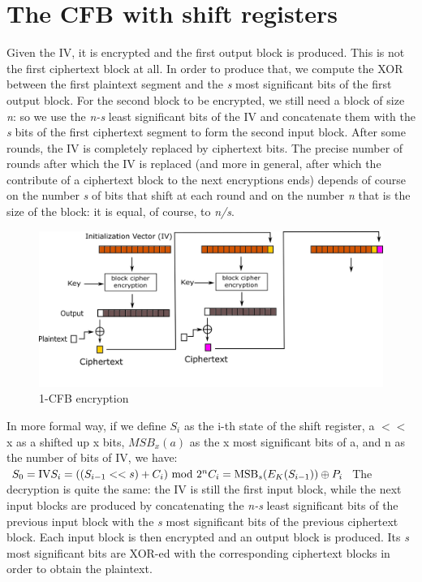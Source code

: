 \documentclass[11 pt]{article}
\begin{document}
\section{The CFB with shift registers}
Given the IV, it is encrypted and the first output block is produced. This is not the first ciphertext block at all. In order to produce that, we compute the XOR between the first plaintext segment and the \textit{s} most significant bits of the first output block. For the second block to be encrypted, we still need a block of size \textit{n}: so we use the \textit{n-s} least significant bits of the IV and concatenate them with the \textit{s} bits of the first ciphertext segment to form the second input block. After some rounds, the IV is completely replaced by ciphertext bits. The precise number of rounds after which the IV is replaced (and more in general, after which the contribute of a ciphertext block to the next encryptions ends) depends of course on the number \textit{s} of bits that shift at each round and on the number \textit{n} that is the size of the block: it is equal, of course, to \textit{n/s}.
\begin{figure}[!ht]
	\centering %
	\includegraphics[width=1\textwidth]{1_CFB_encryption-hw1-1699981.png} %
	\caption{1-CFB encryption} %
	\label{fig:1_CFB_encryption}
\end{figure}

In more formal way, if we define $ S_i $ as the i-th state of the shift register, a $<<$ x as a shifted up x bits, $MSB_x(a)$ as the x most significant bits of a, and n as the number of bits of IV, we have:
\begin{math}
\newline\newline
S_{0}= {\mbox{IV}}
\newline\newline
S_{i} = ((S_{i-1}<<s)+C_{i}){\mbox{ mod }}2^{n}
\newline\newline
C_{i}={\mbox{MSB}}_s(E_{K}(S_{i-1}))\oplus P_{i}
\newline\newline
\end{math}
The decryption is quite the same: the IV is still the first input block, while the next input blocks are produced by concatenating the \textit{n-s} least significant bits of the previous input block with the \textit{s} most significant bits of the previous ciphertext block. Each input block is then encrypted and an output block is produced. Its \textit{s} most significant bits are XOR-ed with the corresponding ciphertext blocks in order to obtain the plaintext.
\end{document}
